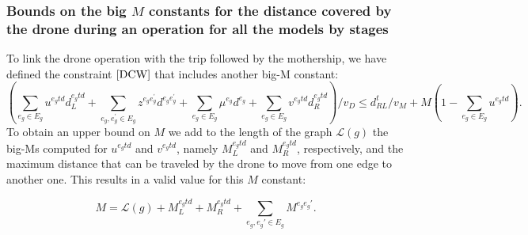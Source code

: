 

\subsubsection*{Bounds on the big $M$ constants for the distance covered by the drone during an operation for all the models by stages}
\noindent
To link the drone operation with the trip followed by the mothership, we have defined the constraint $\eqref{DCW}$ that includes another big-M constant:
\begin{equation*}
\left(\sum_{e_g\in E_g} u^{e_gtd}d_L^{e_gtd} + \sum_{e_g, e^\prime_g\in E_g}z^{e_ge^\prime_g}d^{e_ge^\prime_g} + \sum_{e_g\in E_g} \mu^{e_g}d^{e_g} + \sum_{e_g\in E_g} v^{e_gtd}d_R^{e_gtd}\right)/v_D \leq d_{RL}^t/v_M + M(1 - \sum_{e_g\in E_g} u^{e_gtd}).
\end{equation*}
\noindent
To obtain an upper bound on $M$ we add to the length of the graph $\mathcal L(g)$ the big-Ms computed for $u^{e_gtd}$ and $v^{e_gtd}$, namely $M_{L}^{e_gtd}$ and $M_R^{e_gtd}$, respectively, and the maximum distance that can be traveled by the drone to move from one edge to another one. This results in a valid value for this $M$ constant:

$$M = \mathcal{L}(g) + M_L^{e_gtd} + M_R^{e_gtd} + \sum_{e_g, e_g'\in E_g}M^{e_ge_g'}.$$

